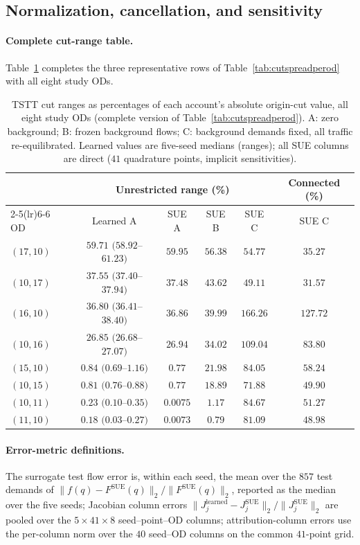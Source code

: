 \subsection{Normalization, cancellation, and sensitivity}\label{supp:additional}
\paragraph{Complete cut-range table.}
Table~\ref{tab:cutspreadfull} completes the three representative rows of
Table~\ref{tab:cutspreadperod} with all eight study ODs.
\begin{table}[pos=htbp]
\caption{TSTT cut ranges as percentages of each account's absolute
origin-cut value, all eight study ODs (complete version of
Table~\ref{tab:cutspreadperod}). A: zero background; B: frozen background
flows; C: background demands fixed, all traffic re-equilibrated. Learned
values are five-seed medians (ranges); all SUE columns are direct
($41$ quadrature points, implicit sensitivities).}\label{tab:cutspreadfull}
\footnotesize
\begin{tabular*}{\tblwidth}{@{\extracolsep{\fill}}lccccc}
\toprule
& \multicolumn{4}{c}{Unrestricted range (\%)} & Connected (\%)\\
\cmidrule(lr){2-5}\cmidrule(lr){6-6}
OD & Learned A & SUE A & SUE B & SUE C & SUE C\\
\midrule
$(17,10)$ & $59.71$ $(58.92$--$61.23)$ & $59.95$ & $56.38$ & $54.77$ & $35.27$ \\
$(10,17)$ & $37.55$ $(37.40$--$37.94)$ & $37.48$ & $43.62$ & $49.11$ & $31.57$ \\
$(16,10)$ & $36.80$ $(36.41$--$38.40)$ & $36.86$ & $39.99$ & $166.26$ & $127.72$ \\
$(10,16)$ & $26.85$ $(26.68$--$27.07)$ & $26.94$ & $34.02$ & $109.04$ & $83.80$ \\
$(15,10)$ & $0.84$ $(0.69$--$1.16)$ & $0.77$ & $21.98$ & $84.05$ & $58.24$ \\
$(10,15)$ & $0.81$ $(0.76$--$0.88)$ & $0.77$ & $18.89$ & $71.88$ & $49.90$ \\
$(10,11)$ & $0.23$ $(0.10$--$0.35)$ & $0.0075$ & $1.17$ & $84.67$ & $51.27$ \\
$(11,10)$ & $0.18$ $(0.03$--$0.27)$ & $0.0073$ & $0.79$ & $81.09$ & $48.98$ \\
\bottomrule
\end{tabular*}
\end{table}
\paragraph{Error-metric definitions.}
The surrogate test flow error is, within each seed, the mean over the
$857$ test demands of
$\|f(q)-F^{\mathrm{SUE}}(q)\|_2/\|F^{\mathrm{SUE}}(q)\|_2$, reported
as the median over the five seeds; Jacobian column errors
$\|J_j^{\mathrm{learned}}-J_j^{\mathrm{SUE}}\|_2/\|J_j^{\mathrm{SUE}}\|_2$
are pooled over the $5\times41\times8$ seed--point--OD columns;
attribution-column errors use the per-column norm over the $40$
seed--OD columns on the common $41$-point grid.

